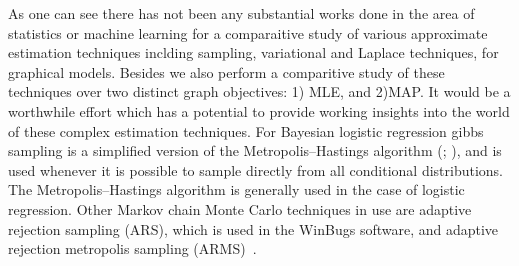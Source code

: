 As one can see there has not been any substantial works done in the area of
statistics or machine learning for a comparaitive study of various approximate
estimation techniques inclding sampling, variational and Laplace techniques, for
graphical models. Besides we also perform a comparitive study of these
techniques over two distinct graph objectives: 1) MLE, and 2)MAP. It
would be a worthwhile effort which has a potential to provide working insights
into the world of these complex estimation techniques. For Bayesian logistic
regression gibbs sampling is a simplified version of the Metropolis–Hastings
algorithm (\cite{Metropolis53}; \cite{Hastings70}), and is used whenever it is
possible to sample directly from all conditional distributions. The Metropolis–Hastings algorithm
is generally used in the case of logistic regression. Other Markov chain
Monte Carlo techniques in use are adaptive rejection sampling (ARS), 
which is used in the WinBugs
software, and adaptive rejection metropolis sampling (ARMS)~\cite{gilks_95}.


